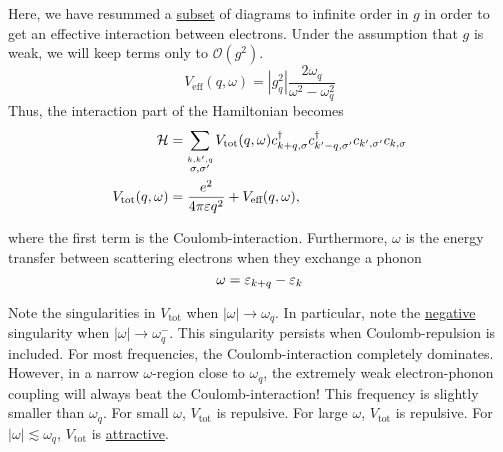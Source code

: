 Here, we have resummed a \underline{subset} of diagrams to infinite order in $g$ in order to get an effective interaction between electrons. Under the assumption that $g$ is weak, we will keep terms only to $\mathcal{O}(g^2)$.
\begin{equation}
V_{\text{eff}}(q, \omega) = |g_q^2|\frac{2\omega_q}{\omega^2-\omega_q^2}
\end{equation}
Thus, the interaction part of the Hamiltonian becomes 
\begin{align}
\mathcal{H} &= \sum_{\stackrel{k,k',q}{\sigma,\sigma'}}V_{\text{tot}}(q, \omega)c_{k+q, \sigma}^\dagger c_{k'-q, \sigma'}^\dagger c_{k', \sigma'}c_{k,\sigma} \\
V_{\text{tot}}(q, \omega) &= \frac{e^2}{4\pi\varepsilon q^2} + V_{\text{eff}}(q, \omega),
\end{align}

where the first term is the Coulomb-interaction. 
Furthermore, $\omega$ is the energy transfer between scattering electrons when they exchange a phonon
\begin{equation}
\omega = \varepsilon_{k+q} - \varepsilon_k
\end{equation}


Note the singularities in $V_{\text{tot}}$ when $|\omega|\rightarrow\omega_q$. In particular, note the \underline{negative} singularity when $|\omega|\rightarrow\omega_q^-$. This singularity persists when Coulomb-repulsion is included. For most frequencies, the Coulomb-interaction completely dominates. However, in a narrow $\omega$-region close to $\omega_q$, the extremely weak electron-phonon coupling will always beat the Coulomb-interaction! This frequency is slightly smaller than $\omega_q$. For small $\omega$, $V_{\text{tot}}$ is repulsive. For large $\omega$, $V_{\text{tot}}$ is repulsive. For $|\omega| \lesssim \omega_q$, $V_{\text{tot}}$ is \underline{attractive}.


